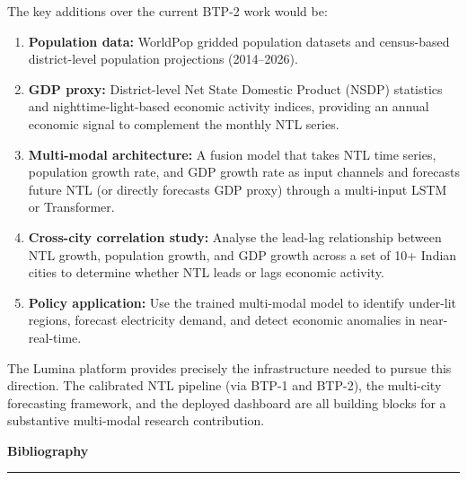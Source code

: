 \documentclass[12pt,a4paper]{report}
\begin{document}
The key additions over the current BTP-2 work would be:

\begin{enumerate}[leftmargin=1.5cm]
    \item \textbf{Population data:} WorldPop gridded population datasets and census-based district-level population projections (2014--2026).
    \item \textbf{GDP proxy:} District-level Net State Domestic Product (NSDP) statistics and nighttime-light-based economic activity indices, providing an annual economic signal to complement the monthly NTL series.
    \item \textbf{Multi-modal architecture:} A fusion model that takes NTL time series, population growth rate, and GDP growth rate as input channels and forecasts future NTL (or directly forecasts GDP proxy) through a multi-input LSTM or Transformer.
    \item \textbf{Cross-city correlation study:} Analyse the lead-lag relationship between NTL growth, population growth, and GDP growth across a set of 10+ Indian cities to determine whether NTL leads or lags economic activity.
    \item \textbf{Policy application:} Use the trained multi-modal model to identify under-lit regions, forecast electricity demand, and detect economic anomalies in near-real-time.
\end{enumerate}

The Lumina platform provides precisely the infrastructure needed to pursue this direction. The calibrated NTL pipeline (via BTP-1 and BTP-2), the multi-city forecasting framework, and the deployed dashboard are all building blocks for a substantive multi-modal research contribution.

\newpage
\thispagestyle{plain}
\begin{center}
    \hypertarget{sec:bib}{}%
    {\Large \textbf{Bibliography}}\\[0.3cm]
    \noindent\rule{\linewidth}{0.6pt}\\[0.8cm]
\end{center}



\end{document}
